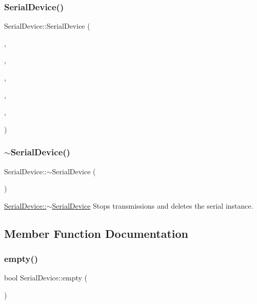 \subsubsection{\texorpdfstring{Serial\+Device()}{SerialDevice()}\hspace{0.1cm}{\footnotesize\ttfamily [5/5]}}
{\footnotesize\ttfamily Serial\+Device\+::\+Serial\+Device (\begin{DoxyParamCaption}\item[{Q\+String}]{,  }\item[{int}]{,  }\item[{int}]{,  }\item[{int}]{,  }\item[{int}]{,  }\item[{int}]{ }\end{DoxyParamCaption})}

\hypertarget{class_serial_device_abd30865bc9e855e8be713f666d6b4244}{}\label{class_serial_device_abd30865bc9e855e8be713f666d6b4244} 
\subsubsection{\texorpdfstring{$\sim$\+Serial\+Device()}{~SerialDevice()}}
{\footnotesize\ttfamily Serial\+Device\+::$\sim$\+Serial\+Device (\begin{DoxyParamCaption}{ }\end{DoxyParamCaption})}



\hyperlink{class_serial_device_abd30865bc9e855e8be713f666d6b4244}{Serial\+Device\+::$\sim$\+Serial\+Device} Stops transmissions and deletes the serial instance. 



\subsection{Member Function Documentation}
\hypertarget{class_serial_device_ae9fc540188704dbdbf3e75d482a92b86}{}\label{class_serial_device_ae9fc540188704dbdbf3e75d482a92b86} 
\subsubsection{\texorpdfstring{empty()}{empty()}}
{\footnotesize\ttfamily bool Serial\+Device\+::empty (\begin{DoxyParamCaption}{ }\end{DoxyParamCaption})\hspace{0.3cm}{\ttfamily [virtual]}}



